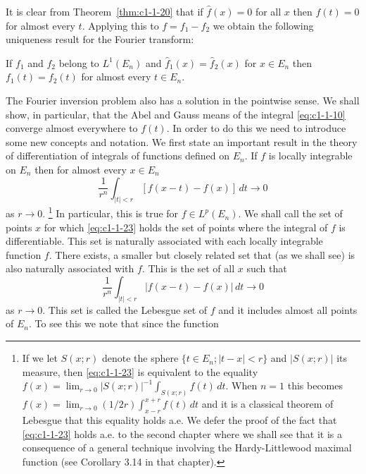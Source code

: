 It is clear from Theorem~\ref{thm:c1-1-20} that if $\hat{f}(x) = 0$ for all $x$
then $f(t) = 0$ for almost every $t$. Applying this to $f = f_{1} - f_{2}$ we
obtain the following uniqueness result for the Fourier transform:

\begin{corollary}\label{cor:c1-1-22}
If $f_{1}$ and $f_{2}$ belong to $L^{1}(E_{n})$ and
$\hat{f}_{1}(x) = \hat{f}_{2}(x)$ for $x \in E_{n}$ then $f_{1}(t) = f_{2}(t)$
for almost every $t \in E_{n}$.
\end{corollary}

The Fourier inversion problem also has a solution in the pointwise sense. We
shall show, in particular, that the Abel and Gauss means of the integral
\eqref{eq:c1-1-10} converge almost everywhere to $f(t)$. In order to do this we
need to introduce some new concepts and notation. We first state an important
result in the theory of differentiation of integrals of functions defined on
$E_{n}$. If $f$ is locally integrable on $E_{n}$ then for almost every
$x \in E_{n}$
\begin{equation}\label{eq:c1-1-23}
\frac{1}{r^{n}}\int_{|t|<r}[f(x-t)-f(x)]\,dt\to0
\end{equation}
as $r \to 0$.%
\footnote{If we let $S(x;r)$ denote the sphere
$\{t\in E_{n};|t-x|<r\}$ and $|S(x;r)|$ its measure, then \eqref{eq:c1-1-23} is
equivalent to the equality
$f(x)=\lim_{r\to0}|S(x;r)|^{-1}\int_{S(x;r)}f(t)\,dt$. When $n=1$ this becomes
$f(x)=\lim_{r\to0}(1/2r)\int_{x-r}^{x+r}f(t)\,dt$ and it is a classical theorem
of Lebesgue that this equality holds a.e. We defer the proof of the fact that
\eqref{eq:c1-1-23} holds a.e. to the second chapter where we shall see that it is
a consequence of a general technique involving the Hardy-Littlewood maximal
function (see Corollary 3.14 in that chapter).}
In particular, this is true for $f \in L^{p}(E_{n})$. We shall call the set of
points $x$ for which \eqref{eq:c1-1-23} holds the set of points where the
integral of $f$ is differentiable. This set is naturally associated with each
locally integrable function $f$. There exists, a smaller but closely related set
that (as we shall see) is also naturally associated with $f$. This is the set of
all $x$ such that
\begin{equation}\label{eq:c1-1-24}
\frac{1}{r^{n}}\int_{|t|<r}|f(x-t)-f(x)|\,dt\to0
\end{equation}
as $r \to 0$. This set is called the Lebesgue set of $f$ and it includes almost
all points of $E_{n}$. To see this we note that since the function
